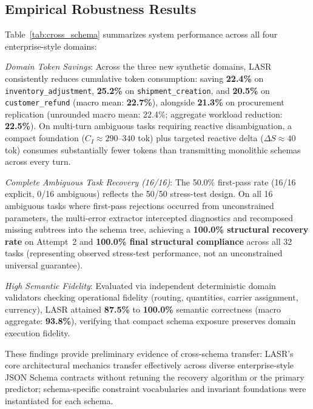\subsection{Empirical Robustness Results}
Table~\ref{tab:cross_schema} summarizes system performance across all four enterprise-style domains:

\textit{Domain Token Savings}: Across the three new synthetic domains, LASR consistently reduces cumulative token consumption: saving \textbf{22.4\%} on \texttt{inventory\_adjustment}, \textbf{25.2\%} on \texttt{shipment\_creation}, and \textbf{20.5\%} on \texttt{customer\_refund} (macro mean: \textbf{22.7\%}), alongside \textbf{21.3\%} on procurement replication (unrounded macro mean: 22.4\%; aggregate workload reduction: \textbf{22.5\%}). On multi-turn ambiguous tasks requiring reactive disambiguation, a compact foundation ($C_I \approx 290$--$340$ tok) plus targeted reactive delta ($\Delta S \approx 40$ tok) consumes substantially fewer tokens than transmitting monolithic schemas across every turn.

\textit{Complete Ambiguous Task Recovery (16/16)}: The 50.0\% first-pass rate (16/16 explicit, 0/16 ambiguous) reflects the 50/50 stress-test design. On all 16 ambiguous tasks where first-pass rejections occurred from unconstrained parameters, the multi-error extractor intercepted diagnostics and recomposed missing subtrees into the schema tree, achieving a \textbf{100.0\% structural recovery rate} on Attempt~2 and \textbf{100.0\% final structural compliance} across all 32 tasks (representing observed stress-test performance, not an unconstrained universal guarantee).

\textit{High Semantic Fidelity}: Evaluated via independent deterministic domain validators checking operational fidelity (routing, quantities, carrier assignment, currency), LASR attained \textbf{87.5\%} to \textbf{100.0\%} semantic correctness (macro aggregate: \textbf{93.8\%}), verifying that compact schema exposure preserves domain execution fidelity.

These findings provide preliminary evidence of cross-schema transfer: LASR's core architectural mechanics transfer effectively across diverse enterprise-style JSON Schema contracts without retuning the recovery algorithm or the primary predictor; schema-specific constraint vocabularies and invariant foundations were instantiated for each schema.
